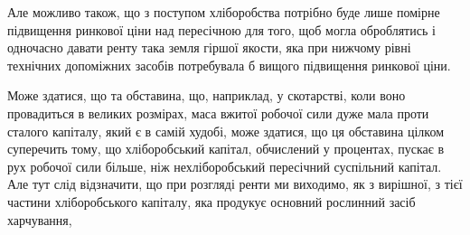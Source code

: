 Але можливо також, що з поступом хліборобства потрібно буде лише помірне
підвищення ринкової ціни над пересічною для того, щоб могла оброблятись
і одночасно давати ренту така земля гіршої якости, яка при нижчому рівні
технічних допоміжних засобів потребувала б вищого підвищення ринкової ціни.

Може здатися, що та обставина, що, наприклад, у скотарстві, коли воно провадиться
в великих розмірах, маса вжитої робочої сили дуже мала проти сталого
капіталу, який є в самій худобі, може здатися, що ця обставина цілком суперечить
тому, що хліборобський капітал, обчислений у процентах, пускає в рух робочої
сили більше, ніж нехліборобський пересічний суспільний капітал. Але тут слід
відзначити, що при розгляді ренти ми виходимо, як з вирішної, з тієї частини
хліборобського капіталу, яка продукує основний рослинний засіб харчування,
\parbreak{}  %
